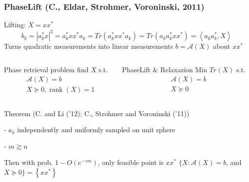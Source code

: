 \documentclass[UTF8]{beamer}
\begin{document}
\begin{frame}[c]\frametitle{PhaseLift (C., Eldar, Strohmer, Voroninski, 2011)}
Lifting: $X=x x^{*}$
$$
b_{k}=| a_{k}^* x|^{2}=a_{k}^{*} x x^{*} a_{k}= Tr(a_{k}^{*} x x^{*} a_{k}) = Tr(a_{k} a_{k}^{*} x x^{*} )
=\left\langle a_{k} a_{k}^{*}, X\right\rangle
$$
Turns quadratic measurements into linear measurements $b=\mathcal{A}(X)$ about $x x^{*}$

\begin{columns}

\begin{column}{0.5\textwidth}
\begin{block}{Phase retrieval problem}
find $X$
s.t.
$$\begin{aligned}
&\mathcal{A}(X)=b \\
&X \succeq 0
, \operatorname{rank}(X)=1
\end{aligned}
$$
\end{block}
\end{column}

\begin{column}{0.5\textwidth}
\begin{block}{PhaseLift \& Relaxazion}
Min $Tr(X)$
s.t.
$$\begin{aligned}
&\mathcal{A}(X)=b \\
&X \succeq 0
\end{aligned}
$$
\end{block}
\end{column}

\end{columns}

\begin{alertblock}{Theorem (C. and Li (’12); C., Strohmer and Voroninski (’11))}

- $a_{k}$ independently and uniformly sampled on unit sphere

- $m \gtrsim n$

Then with prob. $1-O\left(e^{-\gamma m}\right)$, only feasible point is $x x^{*}$ $\{X: \mathcal{A}(X)=b$, and $X \succeq 0\}=\left\{x x^{*}\right\}$
\end{alertblock}
\end{frame}
\end{document}
